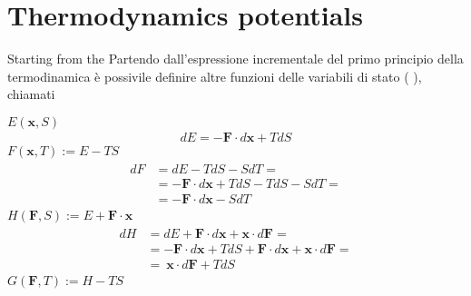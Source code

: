 \documentclass[letterpaper,10pt,english]{jupyterBook}
\begin{document}
\sphinxstepscope


\chapter{Thermodynamics potentials}
\label{\detokenize{ch/potentials:thermodynamics-potentials}}\label{\detokenize{ch/potentials:classical-thermodynamics-potentials}}\label{\detokenize{ch/potentials::doc}}
\sphinxAtStartPar
Starting from the
Partendo dall’espressione incrementale del primo principio della termodinamica è possivile definire altre funzioni delle variabili di stato ( ), chiamati 

\sphinxAtStartPar
{} \(E(\mathbf{x}, S)\)
\begin{equation*}
\begin{split}d E = - \mathbf{F} \cdot d \mathbf{x} + T dS\end{split}
\end{equation*}
\sphinxAtStartPar
{} \(F(\mathbf{x}, T) := E - T S\)
\begin{equation*}
\begin{split}\begin{aligned}
d F & = d E - T dS - S dT = \\
    & = - \mathbf{F} \cdot d \mathbf{x} + T dS - T dS - S dT = \\
    & = - \mathbf{F} \cdot d \mathbf{x} - S dT 
\end{aligned}\end{split}
\end{equation*}
\sphinxAtStartPar
{} \(H(\mathbf{F}, S) := E + \mathbf{F} \cdot \mathbf{x}\)
\begin{equation*}
\begin{split}\begin{aligned}
d H & = d E + \mathbf{F} \cdot d \mathbf{x} + \mathbf{x} \cdot d \mathbf{F} = \\
    & = - \mathbf{F} \cdot d \mathbf{x} + T dS + \mathbf{F} \cdot d \mathbf{x} + \mathbf{x} \cdot d \mathbf{F}= \\
    & = \ \mathbf{x} \cdot d \mathbf{F} + T dS 
\end{aligned}\end{split}
\end{equation*}
\sphinxAtStartPar
{} \(G(\mathbf{F}, T) := H - T S\)
\end{document}
